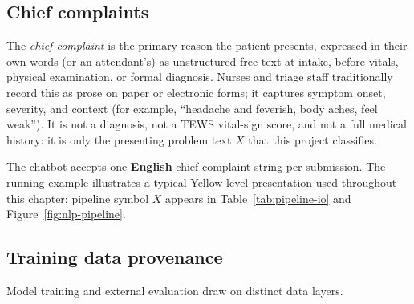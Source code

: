 \subsection{Chief complaints}
\label{sec:chief-complaints}

The \emph{chief complaint} is the primary reason the patient presents, expressed in their own words (or an attendant's) as unstructured free text at intake, before vitals, physical examination, or formal diagnosis. Nurses and triage staff traditionally record this as prose on paper or electronic forms; it captures symptom onset, severity, and context (for example, ``headache and feverish, body aches, feel weak''). It is not a diagnosis, not a TEWS vital-sign score, and not a full medical history: it is only the presenting problem text \(X\) that this project classifies.

The chatbot accepts one \textbf{English} chief-complaint string per submission. The running example \runningcomplaint{} illustrates a typical Yellow-level presentation used throughout this chapter; pipeline symbol \(X\) appears in Table~\ref{tab:pipeline-io} and Figure~\ref{fig:nlp-pipeline}.

\subsection{Training data provenance}
\label{sec:data-provenance}

Model training and external evaluation draw on distinct data layers.

